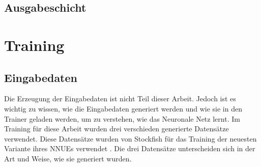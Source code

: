 \subsection{Ausgabeschicht}


\section{Training}

\subsection{Eingabedaten}

Die Erzeugung der Eingabedaten ist nicht Teil dieser Arbeit. Jedoch ist es wichtig zu wissen, wie die Eingabedaten generiert werden und wie sie in den Trainer geladen werden, um zu verstehen, wie das Neuronale Netz lernt. Im Training für diese Arbeit wurden drei verschieden generierte Datensätze verwendet. Diese Datensätze wurden von Stockfish für das Training der neuesten Variante ihres \acp{NNUE} verwendet \cite{StockfishNewestNetJul04}. Die drei Datensätze unterscheiden sich in der Art und Weise, wie sie generiert wurden.






